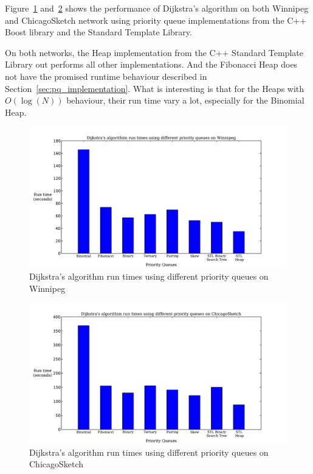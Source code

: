 Figure~\ref{fig:pq_runtime2} and~\ref{fig:pq_runtime} shows the performance of Dijkstra's algorithm on both Winnipeg and ChicagoSketch network using priority queue implementations from the C++ Boost library and the Standard Template Library.

On both networks, the Heap implementation from the C++ Standard Template Library out performs all other implementations.
And the Fibonacci Heap does not have the promised runtime behaviour described in Section~\ref{sec:pq_implementation}.
What is interesting is that for the Heaps with $O(\log(N))$ behaviour, their run time vary a lot, especially for the Binomial Heap.

\begin{figure}[H]
    \centering
    \includegraphics[width=\textwidth]{img/pq_runtime2}
    \caption{Dijkstra's algorithm run times using different priority queues on Winnipeg}
    \label{fig:pq_runtime2}
\end{figure}

\begin{figure}[H]
    \centering
    \includegraphics[width=\textwidth]{img/pq_runtime}
    \caption{Dijkstra's algorithm run times using different priority queues on ChicagoSketch}
    \label{fig:pq_runtime}
\end{figure}

